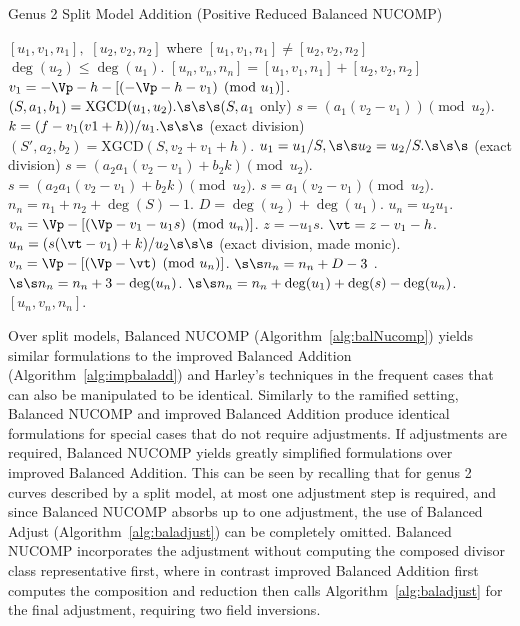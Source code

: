     
\begin{algorithm}[htbp]
\caption{Genus 2 Split Model Addition (Positive Reduced Balanced NUCOMP)}
\label{alg:g2balnucomp}
\begin{algorithmic}[1]
\Require $[u_1,v_1,n_1],$ $[u_2,v_2,n_2]$ where $[u_1,v_1,n_1] \neq [u_2,v_2,n_2]$$\deg(u_2) \leq \deg(u_1)$.
\Ensure $[u_n,v_n,n_n] = [u_1,v_1,n_1] + [u_2,v_2,n_2]$
    \State $v_1 = -\Vp - h - [(-\Vp - h - v_1) \pmod{u_1}]$.
\EndIf
\State $(S,a_1,b_1) = \mathrm{XGCD}(u_1,u_2). \s\s\s  (S, a_1$ only)
\State $s = (a_1(v_2 - v_1)) \pmod{u_2}$.
\State $k = (f - v_1(v1 + h))/u_1. \s\s\s$ (exact division)
    \State $(S',a_2,b_2) = \mathrm{XGCD}(S,v_2 + v_1 + h)$.
        \State $u_1 = u_1/S, \s\s u_2 = u_2/S. \s\s\s$ (exact division)
        \State $s = (a_2a_1(v_2 - v_1) + b_2k) \pmod{u_2}$.
    \Else
        \State $s = (a_2a_1(v_2 - v_1) + b_2k) \pmod{u_2}$.
    \EndIf
\Else
    \State $s = a_1(v_2 - v_1) \pmod{u_2}$.
\EndIf
\State $n_n = n_1 + n_2 + \deg(S) - 1$.
\State $D = \deg(u_2) + \deg(u_1)$.
    \State $u_n = u_2u_1$.
    \State $v_n = \Vp - [(\Vp - v_1 - u_1s) \pmod{u_n}]$.
\Else
    \State $z = -u_1s$.
    \State $\vt = z - v_1 - h$.
    \State $u_n = (s(\vt - v_1) + k)/u_2 \s\s\s$ (exact division, made monic).
    \State $v_n = \Vp - [(\Vp - \vt) \pmod{u_n}]$.
         $\s\s n_n = n_n + D - 3$ .
        \Else \hspace{101pt} $\s\s n_n = n_n + 3 - \deg(u_n)$. 
        \EndIf
    \Else $\s\s n_n = n_n + \deg(u_1) + \deg(s) - \deg(u_n)$.
    \EndIf
\EndIf
\State \Return $[u_n,v_n,n_n]$.
\end{algorithmic}
\end{algorithm}

\newpage
 
Over split models, Balanced NUCOMP (Algorithm~\ref{alg:balNucomp}) yields
similar formulations to the improved Balanced Addition
(Algorithm~\ref{alg:impbaladd}) and Harley's techniques in the frequent cases
that can also be manipulated to be identical. Similarly to the ramified setting,
Balanced NUCOMP and improved Balanced Addition produce identical formulations
for special cases that do not require adjustments. If adjustments are required,
Balanced NUCOMP yields greatly simplified formulations over improved Balanced
Addition. This can be seen by recalling that for genus 2 curves described by
a split model, at most one adjustment step is required, and since Balanced
NUCOMP absorbs up to one adjustment, the use of Balanced Adjust
(Algorithm~\ref{alg:baladjust}) can be completely omitted. Balanced NUCOMP
incorporates the adjustment without computing the composed divisor class
representative first, where in contrast improved Balanced Addition first
computes the composition and reduction then calls Algorithm~\ref{alg:baladjust}
for the final adjustment, requiring two field inversions. 

